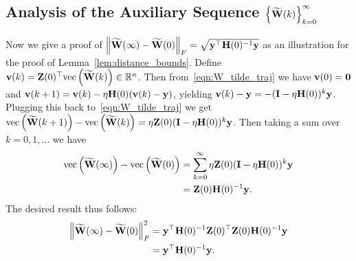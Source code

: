 \subsection{Analysis of the Auxiliary Sequence $\left\{\widetilde{\mathbf{W}}(k)\right\}_{k=0}^\infty$}
\label{sec:proof_sketch_distance}
Now we give a proof of  $\left\|\widetilde{\mathbf{W}}(\infty) - \widetilde{\mathbf{W}}(0)\right\|_F = \sqrt{\mathbf{y}^\top \mathbf{H}(0)^{-1} \mathbf{y}}$ as an illustration for the proof of Lemma~\ref{lem:distance_bounds}.
Define $\mathbf{v}(k) = \mathbf{Z}(0)^\top \text{vec}\left(\widetilde{\mathbf{W}}(k)\right) \in \mathbb{R}^n$.
Then from~\eqref{eqn:W_tilde_traj} we have $\mathbf{v}(0)=\mathbf{0}$ and $\mathbf{v}(k+1) = \mathbf{v}(k) - \eta \mathbf{H}(0) (\mathbf{v}(k) - \mathbf{y})$, yielding
$\mathbf{v}(k) - \mathbf{y} = - (\mathbf{I} - \eta \mathbf{H}(0))^k \mathbf{y}$.
Plugging this back to~\eqref{eqn:W_tilde_traj} we get
$\text{vec}\left(\widetilde{\mathbf{W}}(k+1)\right) - \text{vec}\left(\widetilde{\mathbf{W}}(k)\right) = \eta \mathbf{Z}(0) (\mathbf{I} - \eta \mathbf{H}(0))^k \mathbf{y}$.
Then taking a sum over $k=0, 1, \ldots$ we have
\vspace{-0.2cm}
\begin{align*}
\text{vec}\left(\widetilde{\mathbf{W}}(\infty)\right) - \text{vec}\left(\widetilde{\mathbf{W}}(0)\right) &= \sum_{k=0}^\infty \eta \mathbf{Z}(0) (\mathbf{I} - \eta \mathbf{H}(0))^k \mathbf{y} \\
&= \mathbf{Z}(0) \mathbf{H}(0)^{-1} \mathbf{y}.
\end{align*}
\vspace{-0.2cm}
The desired result thus follows:
\begin{align*}
\left\|\widetilde{\mathbf{W}}(\infty) - \widetilde{\mathbf{W}}(0)\right\|_F^2
&= \mathbf{y}^\top \mathbf{H}(0)^{-1} \mathbf{Z}(0)^\top \mathbf{Z}(0) \mathbf{H}(0)^{-1} \mathbf{y} \\
&= \mathbf{y}^\top \mathbf{H}(0)^{-1} \mathbf{y}.
\end{align*}




